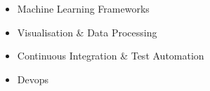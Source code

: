 \documentclass[10pt,a4paper,ragged2e,withhyper]{altacv}
\begin{document}
\begin{paracol}{2}
                \begin{itemize}

                    \item Machine Learning Frameworks
                        \linebreak

                        \divider

                    \item    Visualisation \& Data Processing
                        \linebreak

                        \divider

                    \item    Continuous Integration \& Test Automation
                        \linebreak

                        \divider

                    \item    Devops
                        \linebreak

                \end{itemize}




                \medskip



\end{paracol}
\end{document}
